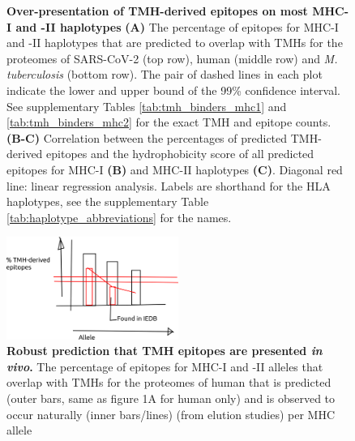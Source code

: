 \begin{figure}[!htbp]
\begin{subfigure}[t]{0.35\textwidth}
    \label{fig:hydrophobicity_2}
  \end{subfigure}  
  \caption{ \textbf{Over-presentation of TMH-derived epitopes on most MHC-I and -II haplotypes}
    \textbf{(A)} 
    The percentage of epitopes for MHC-I and -II haplotypes that are predicted to 
    overlap with TMHs for the proteomes of SARS-CoV-2 (top row), human (middle 
    row) and \emph{M. tuberculosis} (bottom row).
    The pair of dashed lines in each plot indicate the lower and upper bound of the 99\% confidence interval.
    See supplementary Tables \ref{tab:tmh_binders_mhc1} and \ref{tab:tmh_binders_mhc2}
    for the exact TMH and  epitope counts.
    \textbf{(B-C)}
    Correlation between the percentages of predicted TMH-derived epitopes
    and the hydrophobicity score of all predicted epitopes for MHC-I \textbf{(B)}
    and MHC-II haplotypes \textbf{(C)}. 
    Diagonal red line: linear regression analysis. 
    Labels are shorthand for the HLA haplotypes,
    see the supplementary Table \ref{tab:haplotype_abbreviations} for the names.
  }
\end{figure}


\clearpage

\thispagestyle{empty}

%
%
\begin{figure}[!htbp]
  \centering
  \includegraphics[width=0.5\textwidth]{bbbq_article_issue_157/figure_2a.png}
  \caption{
    \textbf{
      Robust prediction that TMH epitopes are presented \emph{in vivo}.
    }
    The percentage of epitopes for MHC-I and -II alleles 
    that overlap with TMHs for the proteomes of human
    that is predicted 
    (outer bars, same as figure 1A for human only) 
    and is observed to occur naturally (inner bars/lines)
    (from elution studies)
    per MHC allele
  }
  \label{fig:elution}
\end{figure}

\clearpage

\thispagestyle{empty}

